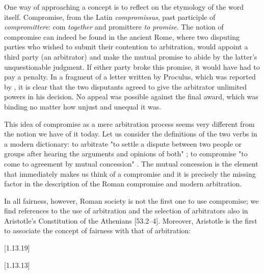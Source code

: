 
One way of approaching a concept is to reflect on the etymology of the word itself. Compromise, from the Latin \textit{compromissus}, past participle of \textit{compromittere}: com \textit{together} and promittere \textit{to promise}.
The notion of compromise can indeed be found in the ancient Rome, where two disputing parties who wished to submit their contention to arbitration, would appoint a third party (an arbitrator) and make the mutual promise to abide by the latter's unquestionable judgment. If either party broke this promise, it would have had to pay a penalty.
In a fragment of a letter written by Proculus, which was reported by \citet[p.529]{Zimmermann1996}, it is clear that the two disputants agreed to give the arbitrator unlimited powers in his decision. No appeal was possible against the final award, which was binding no matter how unjust and unequal it was.

This idea of compromise as a mere arbitration process seems very different from the notion we have of it today. Let us consider the definitions of the two verbs in a modern dictionary: to arbitrate "to settle a dispute between two people or groups after hearing the arguments and opinions of both" \citep{Arbitration}; to compromise "to come to agreement by mutual concession" \citep{Compromise}.
The mutual concession is the element that immediately makes us think of a compromise and it is precisely the missing factor in the description of the Roman compromise and modern arbitration.

In all fairness, however, Roman society is not the first one to use compromise; we find references to the use of arbitration and the selection of arbitrators also in Aristotle’s Constitution of the Athenians [53.2–4]. %
Moreover, Aristotle is the first to associate the concept of fairness with that of arbitration:

\textit{}\citet{OnRhetoric}[1.13.19]

\textit{}\citet{OnRhetoric}[1.13.13]



